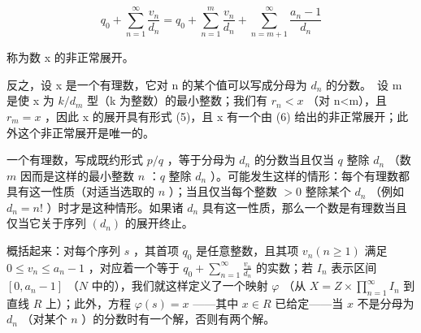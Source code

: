 \[
q _ {0} + \sum_ {n = 1} ^ {\infty} \frac {v _ {n}}{d _ {n}} = q _ {0} + \sum_ {n = 1} ^ {m} \frac {v _ {n}}{d _ {n}} + \sum_ {n = m + 1} ^ {\infty} \frac {a _ {n} - 1}{d _ {n}}\tag{6}
\]

称为数 x 的非正常展开。

反之，设 x 是一个有理数，它对 n 的某个值可以写成分母为 \(d_{n}\) 的分数。~设 m 是使 x 为 \(k/d_{m}\) 型（k 为整数）的最小整数；我们有 \(r_{n}<x\) （对 n\textless m），且 \(r_{m}=x\) ，因此 x 的展开具有形式 (5)，且 x 有一个由 (6) 给出的非正常展开；此外这个非正常展开是唯一的。

一个有理数，写成既约形式 \(p / q\) ，等于分母为 \(d_n\) 的分数当且仅当 \(q\) 整除 \(d_n\) （数 \(m\) 因而是这样的最小整数 \(n\) ：\(q\) 整除 \(d_n\) ）。可能发生这样的情形：每个有理数都具有这一性质（对适当选取的 \(n\) ）；当且仅当每个整数 \(> 0\) 整除某个 \(d_n\) （例如 \(d_n = n!\) ）时才是这种情形。如果诸 \(d_n\) 具有这一性质，那么一个数是有理数当且仅当它关于序列 \((d_n)\) 的展开终止。

概括起来：对每个序列 \(s\) ，其首项 \(q_{0}\) 是任意整数，且其项 \(v_{n}(n \geqslant 1)\) 满足 \(0 \leqslant v_{n} \leqslant a_{n} - 1\) ，对应着一个等于 \(q_{0} + \sum_{n=1}^{\infty} \frac{v_{n}}{d_{n}}\) 的实数；若 \(I_{n}\) 表示区间 \([0, a_{n} - 1]\) （\(N\) 中的），我们就这样定义了一个映射 \(\varphi\) （从 \(X = Z \times \prod_{n=1}^{\infty} I_{n}\) 到直线 \(R\) 上）；此外，方程 \(\varphi(s) = x\) ——其中 \(x \in R\) 已给定——当 \(x\) 不是分母为 \(d_{n}\) （对某个 \(n\) ）的分数时有一个解，否则有两个解。


